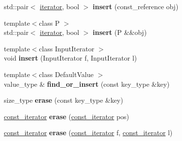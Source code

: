 \begin{DoxyCompactItemize}
\item 
std\+::pair$<$ \hyperlink{classspp___1_1_two__d__iterator}{iterator}, bool $>$ {\bfseries insert} (const\+\_\+reference obj)\hypertarget{classspp___1_1sparse__hashtable_aff73de0b37ca2a857c28626f5fdb5469}{}\label{classspp___1_1sparse__hashtable_aff73de0b37ca2a857c28626f5fdb5469}

\item 
{\footnotesize template$<$class P $>$ }\\std\+::pair$<$ \hyperlink{classspp___1_1_two__d__iterator}{iterator}, bool $>$ {\bfseries insert} (P \&\&obj)\hypertarget{classspp___1_1sparse__hashtable_a06e2f5002d69417180a2a58206bbfc9f}{}\label{classspp___1_1sparse__hashtable_a06e2f5002d69417180a2a58206bbfc9f}

\item 
{\footnotesize template$<$class Input\+Iterator $>$ }\\void {\bfseries insert} (Input\+Iterator f, Input\+Iterator l)\hypertarget{classspp___1_1sparse__hashtable_af49d941c5340927d7c4abb539f7f934c}{}\label{classspp___1_1sparse__hashtable_af49d941c5340927d7c4abb539f7f934c}

\item 
{\footnotesize template$<$class Default\+Value $>$ }\\value\+\_\+type \& {\bfseries find\+\_\+or\+\_\+insert} (const key\+\_\+type \&key)\hypertarget{classspp___1_1sparse__hashtable_a3e0f2c2fc1657e24bb82a15eaf57507c}{}\label{classspp___1_1sparse__hashtable_a3e0f2c2fc1657e24bb82a15eaf57507c}

\item 
size\+\_\+type {\bfseries erase} (const key\+\_\+type \&key)\hypertarget{classspp___1_1sparse__hashtable_add65e2cb0ddfa77d0bb364405f5f0d67}{}\label{classspp___1_1sparse__hashtable_add65e2cb0ddfa77d0bb364405f5f0d67}

\item 
\hyperlink{classspp___1_1_two__d__iterator}{const\+\_\+iterator} {\bfseries erase} (\hyperlink{classspp___1_1_two__d__iterator}{const\+\_\+iterator} pos)\hypertarget{classspp___1_1sparse__hashtable_aaf39fab776b2b7b43c760e00db607007}{}\label{classspp___1_1sparse__hashtable_aaf39fab776b2b7b43c760e00db607007}

\item 
\hyperlink{classspp___1_1_two__d__iterator}{const\+\_\+iterator} {\bfseries erase} (\hyperlink{classspp___1_1_two__d__iterator}{const\+\_\+iterator} f, \hyperlink{classspp___1_1_two__d__iterator}{const\+\_\+iterator} l)\hypertarget{classspp___1_1sparse__hashtable_ad83d56fe80a12ac4eca9280d882725aa}{}\label{classspp___1_1sparse__hashtable_ad83d56fe80a12ac4eca9280d882725aa}


\end{DoxyCompactItemize}
